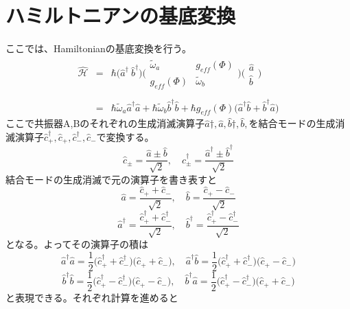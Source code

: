 \section{ハミルトニアンの基底変換}
ここでは、Hamiltonianの基底変換を行う。
\begin{eqnarray}
    \hat{\mathcal{H}}&=&\hbar\biggl(\hat{a}^{\dagger }\ \hat{b}^{\dagger }\biggr)\biggl(\begin{array}{cc}
    \tilde{\omega}_{a} & g_{eff}(\Phi ) \\
    g_{eff}(\Phi ) & \tilde{\omega}_{b}
    \end{array}\biggr)\biggl(\begin{array}{l}
    \hat{a} \\
    \hat{b}
    \end{array}\biggr)\\ \\
    &=& \hbar \tilde{\omega}_{a} \hat{a}^{\dagger} \hat{a}+\hbar \tilde{\omega}_{b} \hat{b}^{\dagger} \hat{b}+\hbar g_{eff}(\Phi)\biggl(\hat{a}^{\dagger}\hat{b}+ \hat{b}^{\dagger}\hat{a}\biggr)
\end{eqnarray}
ここで共振器A,Bのそれぞれの生成消滅演算子$\hat{a}{\dagger},\hat{a},\hat{b}{\dagger},\hat{b},$を結合モードの生成消滅演算子$\hat{c}_{+}^{\dagger},\hat{c}_{+},\hat{c}_{-}^{\dagger},\hat{c}_{-}$で変換する。
\begin{equation}
    \hat{c}_{\pm}=\frac{\hat{a} \pm \hat{b}}{\sqrt{2}} ,\quad \hat{c}_{\pm}^{\dagger}=\frac{\hat{a}^{\dagger} \pm \hat{b}^{\dagger}}{\sqrt{2}}
\end{equation}
結合モードの生成消滅で元の演算子を書き表すと
\begin{equation}
    \hat{a}=\frac{\hat{c}_{+}+\hat{c}_{-}}{\sqrt{2}} ,\quad \hat{b}=\frac{\hat{c}_{+}-\hat{c}_{-}}{\sqrt{2}}
\end{equation}
\begin{equation}
    \hat{a}^{\dagger}=\frac{\hat{c}_{+}^{\dagger}+\hat{c}_{-}^{\dagger}}{\sqrt{2}} ,\quad \hat{b}^{\dagger}=\frac{\hat{c}_{+}^{\dagger}-\hat{c}_{-}^{\dagger}}{\sqrt{2}}
\end{equation}
となる。よってその演算子の積は
\begin{equation}
    \hat{a}^{\dagger} \hat{a}=\frac{1}{2}\biggl(\hat{c}_{+}^{\dagger}+\hat{c}_{-}^{\dagger}\biggr) \biggl(\hat{c}_{+}+\hat{c}_{-}\biggr) ,\quad \hat{a}^{\dagger} \hat{b}=\frac{1}{2}\biggl(\hat{c}_{+}^{\dagger}+\hat{c}_{-}^{\dagger}\biggr)\biggl(\hat{c}_{+}-\hat{c}_{-}\biggr)
\end{equation}
\begin{equation}
    \hat{b}^{\dagger} \hat{b}=\frac{1}{2}\biggl(\hat{c}_{+}^{\dagger}-\hat{c}_{-}^{\dagger}\biggr)\biggl(\hat{c}_{+}-\hat{c}_{-}\biggr) ,\quad \hat{b}^{\dagger}\hat{a} = \frac{1}{2}\biggl(\hat{c}_{+}^{\dagger}-\hat{c}_{-}^{\dagger}\biggr)\biggl(\hat{c}_{+}+\hat{c}_{-}\biggr)
\end{equation}
と表現できる。それぞれ計算を進めると

